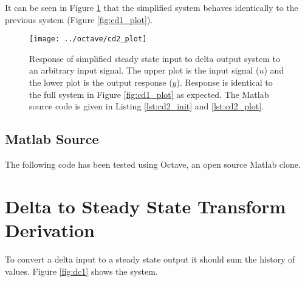 \documentclass{article}
\begin{document}
It can be seen in Figure \ref{fig:cd2_plot} that the simplified system
behaves identically to the previous system (Figure \ref{fig:cd1_plot}).

\begin{figure}[htbp!]
\texttt{[image: ../octave/cd2\_plot]}
\caption{Response of simplified steady state input to delta output system
to an arbitrary input signal.
The upper plot is the input signal ($u$) and the lower plot is
the output response ($y$).
Response is identical to the full system in Figure \ref{fig:cd1_plot}
as expected.
The Matlab source code is given in Listing \ref{lst:cd2_init}
and \ref{lst:cd2_plot}.
}
\label{fig:cd2_plot}
\end{figure}

\clearpage
\subsection{Matlab Source}
\label{app:cdsrc}

The following code has been tested using Octave\autocite{octave},
an open source Matlab clone.





\clearpage





\clearpage
\section{Delta to Steady State Transform Derivation}
\label{app:dsderiv}

To convert a delta input to a steady state output it should
sum the history of values.
Figure \ref{fig:dc1} shows the system.
\end{document}
